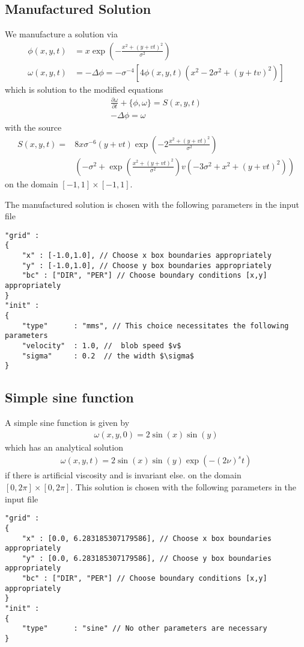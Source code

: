 \subsection{Manufactured Solution}
We manufacture a solution via
\begin{align}
    \phi(x,y,t) &=
    x \exp\left( - \frac{ x^2 + (y+vt)^2}{\sigma^2}\right) \\
    \omega(x,y,t) &= -\Delta \phi = -\sigma^{-4} \left[ 4\phi(x,y,t) ( x^2-2\sigma^2  + (y+tv)^2)\right]
\end{align}
which is solution to the modified equations
\begin{subequations}
\begin{align}
    \frac{\partial \omega}{\partial t} + \{ \phi, \omega\} = S(x,y,t) \\
    -\Delta \phi = \omega
\end{align}
\label{eq:euler_poisson_modified}
\end{subequations}
with the source
\begin{align}
    S(x,y,t) =& 8 x \sigma^{-6}(y+vt)\exp\left( - 2\frac{ x^2 + (y+vt)^2}{\sigma^2} \right) \nonumber\\
    &\left(-\sigma^2  + \exp\left( \frac{ x^2 + (y+vt)^2}{\sigma^2} \right) v( -3\sigma^2 + x^2 + (y+vt)^2) \right)
\end{align}
on the domain $[-1,1]\times [-1,1]$.

The manufactured solution is chosen with the following parameters in the input file
\begin{verbatim}
"grid" :
{
    "x" : [-1.0,1.0], // Choose x box boundaries appropriately
    "y" : [-1.0,1.0], // Choose y box boundaries appropriately
    "bc" : ["DIR", "PER"] // Choose boundary conditions [x,y] appropriately
}
"init" :
{
    "type"      : "mms", // This choice necessitates the following parameters
    "velocity"  : 1.0, //  blob speed $v$
    "sigma"     : 0.2  // the width $\sigma$
}
\end{verbatim}
\subsection{Simple sine function}
A simple sine function is given by
\begin{align}
    \omega(x,y,0) = 2 \sin(x)\sin(y)
\end{align}
which has an analytical solution
\begin{align}
\omega(x,y,t) = 2 \sin(x)\sin(y)\exp( -(2\nu)^s t)
\end{align}
if there is artificial viscosity and is invariant else.
on the domain $[0,2\pi]\times [0,2\pi]$.
This solution is chosen with the following parameters in the input file
\begin{verbatim}
"grid" :
{
    "x" : [0.0, 6.283185307179586], // Choose x box boundaries appropriately
    "y" : [0.0, 6.283185307179586], // Choose y box boundaries appropriately
    "bc" : ["DIR", "PER"] // Choose boundary conditions [x,y] appropriately
}
"init" :
{
    "type"      : "sine" // No other parameters are necessary
}
\end{verbatim}

